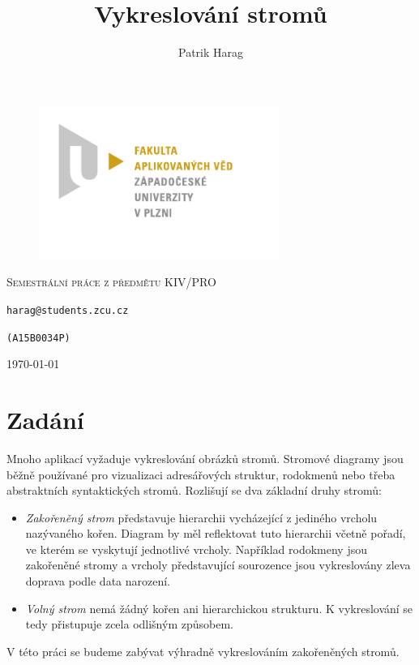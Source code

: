 \documentclass[12pt, a4paper]{report}
\title{Vykreslování stromů}
\author{Patrik Harag}
\makeatletter
\def \thesubtitle {Semestrální práce z předmětu KIV/PRO}
\def \theauthoremail {harag@students.zcu.cz}
\def \theauthorid {(A15B0034P)}
\makeatother
\begin{document}
\begin{titlepage}
	\begin{figure}
		\includegraphics[height=50mm]{img-fav-logo}
	\end{figure}
	
	\centering
	{\large \hspace{1mm} \par} %
	\vspace{15ex}
	
	{\scshape\Large \thesubtitle \par}
	\vspace{1.5ex}
	{\huge\bfseries \thetitle \par}
	\vspace{2ex}
	{\Large\itshape \theauthor \par}
	\vspace{2ex}
	{\texttt{\theauthoremail} \par}
	\vspace{1ex}
	{\texttt{\theauthorid} \par}
	
	\vfill

	{\large \today\par}
\end{titlepage}

\setcounter{page}{0} 
\tableofcontents
\thispagestyle{empty}

\chapter{Zadání}
Mnoho aplikací vyžaduje vykreslování obrázků stromů. Stromové diagramy jsou běžně používané pro vizualizaci adresářových struktur, rodokmenů nebo třeba abstraktních syntaktických stromů. Rozlišují se dva základní druhy stromů:
\begin{itemize}
	\item \emph{Zakořeněný strom} představuje hierarchii vycházející z jediného vrcholu nazývaného kořen. Diagram by měl reflektovat tuto hierarchii včetně pořadí, ve kterém se vyskytují jednotlivé vrcholy.
	Například rodokmeny jsou zakořeněné stromy a vrcholy představující sourozence jsou vykreslovány zleva doprava podle data narození.
	\item \emph{Volný strom} nemá žádný kořen ani hierarchickou strukturu. K vykreslování se tedy přistupuje zcela odlišným způsobem.
\end{itemize}
V této práci se budeme zabývat výhradně vykreslováním zakořeněných stromů.
\end{document}
